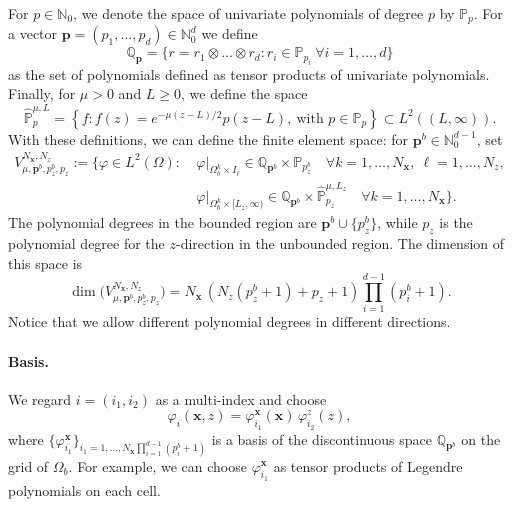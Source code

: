 \documentclass[11pt]{article}
\newcommand{\bx}{\mathbf{x}}
\begin{document}
	For $p\in\mathbb{N}_0$, we denote the space of univariate polynomials of degree $p$ by $\mathbb{P}_p$. For a vector $\mathbf{p}=(p_1,\dots,p_d)\in\mathbb{N}_0^d$ we define
	\[
	\mathbb{Q}_\mathbf{p}=\{r=r_1\otimes\dots\otimes r_d: r_i\in\mathbb{P}_{p_i}\ \forall i=1,\dots,d\}
	\]
	as the set of polynomials defined as tensor products of univariate polynomials. Finally, for $\mu>0$ and $L\ge0$, we define the space
	\[
	\widehat{\mathbb{P}}^{\mu,L}_p=\left\{f: f(z)=e^{-\mu(z-L)/2}p(z-L),\ \text{with } p\in\mathbb{P}_p\right\}\subset L^2((L,\infty)).
	\]
	With these definitions, we can define the finite element space: for $\mathbf{p}^b\in\mathbb{N}_0^{d-1}$, set
	\begin{align*}
		V^{N_\bx,N_z}_{\mu,\mathbf{p}^b,p^b_z,p_z}:=\Big\{\varphi\in L^2(\Omega):\ &\varphi\big|_{\Omega_b^k\times I_\ell}\in\mathbb{Q}_{\mathbf{p}^b}\times\mathbb{P}_{p_z^b}\quad\forall k=1,\dots,N_\bx,\ \ell=1,\dots,N_z,\\
		&\varphi\big|_{\Omega_b^k\times[L_z,\infty)}\in\mathbb{Q}_{\mathbf{p}^b}\times\widehat{\mathbb{P}}^{\mu,L_z}_{p_z}\quad\forall k=1,\dots,N_\bx\Big\}.
	\end{align*}
	The polynomial degrees in the bounded region are $\mathbf{p}^b\cup\{p^b_z\}$, while $p_z$ is the polynomial degree for the $z$-direction in the unbounded region. The dimension of this space is
	\[
	\dim\big(V^{N_\bx,N_z}_{\mu,\mathbf{p}^b,p^b_z,p_z}\big)=N_\bx\,(N_z(p^b_z+1)+p_z+1)\prod_{i=1}^{d-1}(p_i^b+1).
	\]
	Notice that we allow different polynomial degrees in different directions.
	
	\paragraph{Basis.} We regard $i=(i_1,i_2)$ as a multi-index and choose
	\begin{equation}\label{eq:basis}
		\varphi_i(\bx,z)=\varphi^\bx_{i_1}(\bx)\,\varphi^z_{i_2}(z),
	\end{equation}
	where $\{\varphi^\bx_{i_1}\}_{i_1=1,\dots,N_\bx\prod_{i=1}^{d-1}(p_i^b+1)}$ is a basis of the discontinuous space $\mathbb{Q}_{\mathbf{p}^b}$ on the grid of $\Omega_b$. For example, we can choose $\varphi_{i_1}^\bx$ as tensor products of Legendre polynomials on each cell.
	
\end{document}
